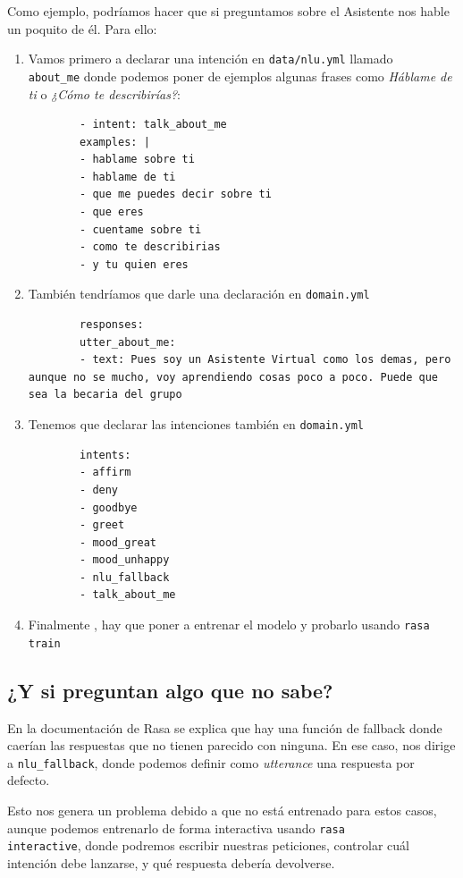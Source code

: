 Como ejemplo, podríamos hacer que si preguntamos sobre el Asistente nos hable un poquito de él. Para ello:

\begin{enumerate}
	\item Vamos primero a declarar una intención en \texttt{data/nlu.yml} llamado \\ \texttt{about\_me} donde podemos poner de ejemplos algunas frases como \textit{Háblame de ti} o \textit{¿Cómo te describirías?}:
	\begin{lstlisting}
		- intent: talk_about_me
		examples: |
		- hablame sobre ti
		- hablame de ti
		- que me puedes decir sobre ti
		- que eres
		- cuentame sobre ti
		- como te describirias
		- y tu quien eres
	\end{lstlisting}

	\item También tendríamos que darle una declaración en \texttt{domain.yml}
	\begin{lstlisting}
		responses:
		utter_about_me:
		- text: Pues soy un Asistente Virtual como los demas, pero aunque no se mucho, voy aprendiendo cosas poco a poco. Puede que sea la becaria del grupo
	\end{lstlisting}

	\item Tenemos que declarar las intenciones también en \texttt{domain.yml}
	\begin{lstlisting}
		intents:
		- affirm
		- deny
		- goodbye
		- greet
		- mood_great
		- mood_unhappy
		- nlu_fallback
		- talk_about_me
	\end{lstlisting}

	\item Finalmente , hay que poner a entrenar el modelo y probarlo usando \texttt{rasa train}
\end{enumerate}

\subsection{¿Y si preguntan algo que no sabe?}

En la documentación de Rasa se explica que hay una función de fallback \cite{rasa-fallback} donde caerían las respuestas que no tienen parecido con ninguna. En ese caso, nos dirige a \texttt{nlu\_fallback}, donde podemos definir como \textit{utterance} una respuesta por defecto.

Esto nos genera un problema debido a que no está entrenado para estos casos, aunque podemos entrenarlo de forma interactiva usando \texttt{rasa \\ interactive}, donde podremos escribir nuestras peticiones, controlar cuál intención debe lanzarse, y qué respuesta debería devolverse. 

